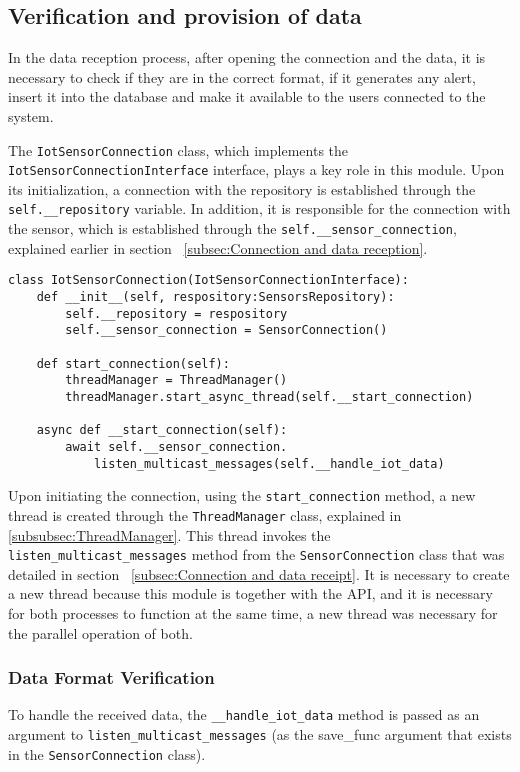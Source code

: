 \subsection[Verification and provision of data]{Verification and provision of data}\label{subsec:checkDataReceived}
In the data reception process, after opening the connection and the data, it is necessary to check if they are in the correct format, if it generates any alert, insert it into the database and make it available to the users connected to the system.

The \texttt{IotSensorConnection} class, which implements the \texttt{IotSensorConnectionInterface} interface, plays a key role in this module. Upon its initialization, a connection with the repository is established through the \texttt{self.\_\_repository} variable. In addition, it is responsible for the connection with the sensor, which is established through the \texttt{self.\_\_sensor\_connection}, explained earlier in section ~\ref{subsec:Connection and data reception}.

\begin{Verbatim}[fontsize=\small, baselinestretch=0.8]
class IotSensorConnection(IotSensorConnectionInterface):
    def __init__(self, respository:SensorsRepository):
        self.__repository = respository
        self.__sensor_connection = SensorConnection()
    
    def start_connection(self):
        threadManager = ThreadManager()
        threadManager.start_async_thread(self.__start_connection)
    
    async def __start_connection(self):
        await self.__sensor_connection.
            listen_multicast_messages(self.__handle_iot_data)
\end{Verbatim}

Upon initiating the connection, using the \texttt{start\_connection} method, a new thread is created through the \texttt{ThreadManager} class, explained in \ref{subsubsec:ThreadManager}. This thread invokes the \texttt{listen\_multicast\_messages} method from the \texttt{SensorConnection} class that was detailed in section ~\ref{subsec:Connection and data receipt}. It is necessary to create a new thread because this module is together with the \gls{API}, and it is necessary for both processes to function at the same time, a new thread was necessary for the parallel operation of both.

\subsubsection{Data Format Verification}
To handle the received data, the \texttt{\_\_handle\_iot\_data} method is passed as an argument to \texttt{listen\_multicast\_messages} (as the save\_func argument that exists in the \texttt{SensorConnection} class).

